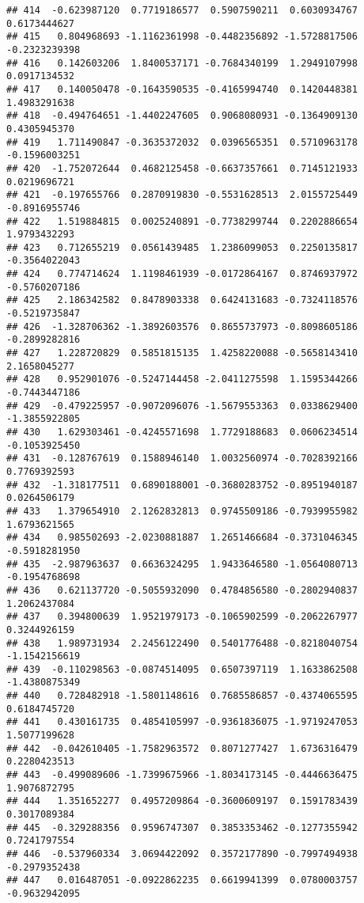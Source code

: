 \documentclass[
]{article}
\begin{document}
\begin{verbatim}
## 414  -0.623987120  0.7719186577  0.5907590211  0.6030934767  0.6173444627
## 415   0.804968693 -1.1162361998 -0.4482356892 -1.5728817506 -0.2323239398
## 416   0.142603206  1.8400537171 -0.7684340199  1.2949107998  0.0917134532
## 417   0.140050478 -0.1643590535 -0.4165994740  0.1420448381  1.4983291638
## 418  -0.494764651 -1.4402247605  0.9068080931 -0.1364909130  0.4305945370
## 419   1.711490847 -0.3635372032  0.0396565351  0.5710963178 -0.1596003251
## 420  -1.752072644  0.4682125458 -0.6637357661  0.7145121933  0.0219696721
## 421  -0.197655766  0.2870919830 -0.5531628513  2.0155725449 -0.8916955746
## 422   1.519884815  0.0025240891 -0.7738299744  0.2202886654  1.9793432293
## 423   0.712655219  0.0561439485  1.2386099053  0.2250135817 -0.3564022043
## 424   0.774714624  1.1198461939 -0.0172864167  0.8746937972 -0.5760207186
## 425   2.186342582  0.8478903338  0.6424131683 -0.7324118576 -0.5219735847
## 426  -1.328706362 -1.3892603576  0.8655737973 -0.8098605186 -0.2899282816
## 427   1.228720829  0.5851815135  1.4258220088 -0.5658143410  2.1658045277
## 428   0.952901076 -0.5247144458 -2.0411275598  1.1595344266 -0.7443447186
## 429  -0.479225957 -0.9072096076 -1.5679553363  0.0338629400 -1.3855922805
## 430   1.629303461 -0.4245571698  1.7729188683  0.0606234514 -0.1053925450
## 431  -0.128767619  0.1588946140  1.0032560974 -0.7028392166  0.7769392593
## 432  -1.318177511  0.6890188001 -0.3680283752 -0.8951940187  0.0264506179
## 433   1.379654910  2.1262832813  0.9745509186 -0.7939955982  1.6793621565
## 434   0.985502693 -2.0230881887  1.2651466684 -0.3731046345 -0.5918281950
## 435  -2.987963637  0.6636324295  1.9433646580 -1.0564080713 -0.1954768698
## 436   0.621137720 -0.5055932090  0.4784856580 -0.2802940837  1.2062437084
## 437   0.394800639  1.9521979173 -0.1065902599 -0.2062267977  0.3244926159
## 438   1.989731934  2.2456122490  0.5401776488 -0.8218040754 -1.1542156619
## 439  -0.110298563 -0.0874514095  0.6507397119  1.1633862508 -1.4380875349
## 440   0.728482918 -1.5801148616  0.7685586857 -0.4374065595  0.6184745720
## 441   0.430161735  0.4854105997 -0.9361836075 -1.9719247053  1.5077199628
## 442  -0.042610405 -1.7582963572  0.8071277427  1.6736316479  0.2280423513
## 443  -0.499089606 -1.7399675966 -1.8034173145 -0.4446636475  1.9076872795
## 444   1.351652277  0.4957209864 -0.3600609197  0.1591783439  0.3017089384
## 445  -0.329288356  0.9596747307  0.3853353462 -0.1277355942  0.7241797554
## 446  -0.537960334  3.0694422092  0.3572177890 -0.7997494938 -0.2979352438
## 447   0.016487051 -0.0922862235  0.6619941399  0.0780003757 -0.9632942095

\end{verbatim}
\end{document}
